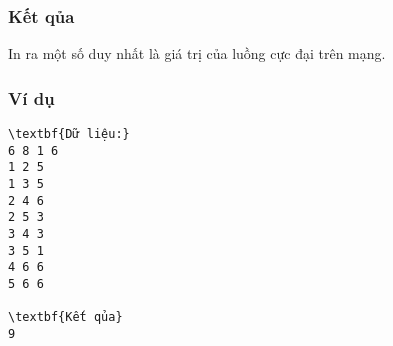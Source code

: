 \subsubsection{   Kết qủa  }

   In ra một số duy nhất là giá trị của luồng cực đại trên mạng.  

\subsubsection{   Ví dụ  }
\begin{verbatim}
\textbf{Dữ liệu:}
6 8 1 6
1 2 5
1 3 5
2 4 6
2 5 3
3 4 3
3 5 1
4 6 6
5 6 6

\textbf{Kết qủa}
9
\end{verbatim}
